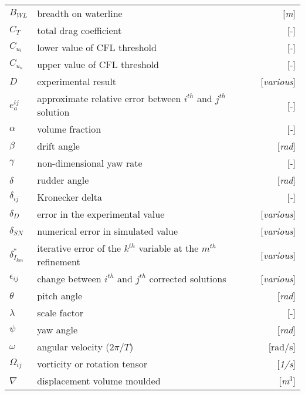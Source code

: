 \setlength{\tabcolsep}{6pt} %
\renewcommand{\arraystretch}{1.45} %

\begin{longtable}{p{1cm}p{10cm}R}

$B_{WL}$ & breadth on waterline & [\textit{m}]\\
$C_{T}$ & total drag coefficient & [-]\\
$C_{u_{l}}$ & lower value of CFL threshold & [-]\\
$C_{u_{u}}$ & upper value of CFL threshold & [-]\\
$D$ & experimental result & [\textit{various}]\\
$e_a^{ij}$ & approximate relative error between $i^{th}$ and $j^{th}$ solution & [-]\\

$\alpha$  & volume fraction & [\textit{-}]\\
$\beta$  & drift angle & [\textit{rad}]\\
$\gamma$  & non-dimensional yaw rate & [-]\\
$\delta$  & rudder angle & [\textit{rad}]\\
$\delta_{ij}$  & Kronecker delta & [\textit{-}]\\
$\delta_{D}$  & error in the experimental value & [\textit{various}]\\
$\delta_{SN}$  & numerical error in simulated value & [\textit{various}]\\
$\delta^{*}_{I_{km}}$  & iterative error of the $k^{th}$ variable at the $m^{th}$ refinement  & [\textit{various}]\\
$\epsilon_{ij}$ & change between $i^{th}$ and $j^{th}$ corrected solutions &  [\textit{various}]\\
$\theta$  & pitch angle & [\textit{rad}]\\
$\lambda$  & scale factor & [-]\\
$\psi$  & yaw angle & [\textit{rad}]\\
$\omega$ & angular velocity ($2\pi/T$) & [rad/s]\\
$\Omega_{ij}$ & vorticity or rotation tensor & [\textit{1/s}]\\
$\nabla $  & displacement volume moulded & [\textit{m$^3$}]\\

\end{longtable}
